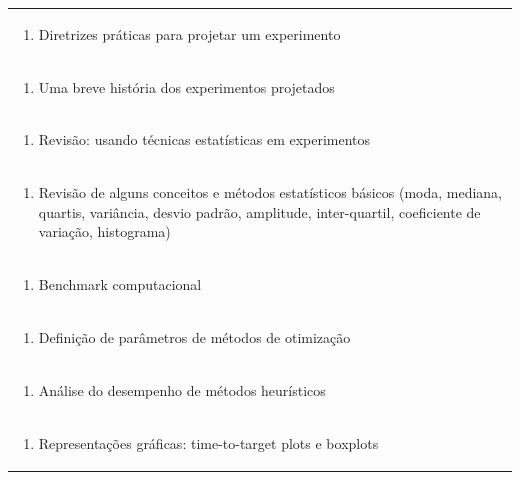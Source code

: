 \documentclass[11pt]{article}
\begin{document}
\begin{center}
\begin{longtable}{|p{4cm}|p{4cm}|p{4cm}|p{4cm}|}
\multicolumn{4}{|p{\dimexpr 16cm + 6\tabcolsep\relax}|}{\begin{enumerate}[start=2]\item Diretrizes práticas para projetar um experimento\end{enumerate}}\\
\multicolumn{4}{|p{\dimexpr 16cm + 6\tabcolsep\relax}|}{\begin{enumerate}[start=3]\item Uma breve história dos experimentos projetados\end{enumerate}}\\
\multicolumn{4}{|p{\dimexpr 16cm + 6\tabcolsep\relax}|}{\begin{enumerate}[start=4]\item Revisão: usando técnicas estatísticas em experimentos\end{enumerate}}\\
\multicolumn{4}{|p{\dimexpr 16cm + 6\tabcolsep\relax}|}{\begin{enumerate}[start=5]\item Revisão de alguns conceitos e métodos estatísticos básicos (moda, mediana, quartis, variância, desvio padrão, amplitude, inter-quartil, coeficiente de variação, histograma)\end{enumerate}}\\
\multicolumn{4}{|p{\dimexpr 16cm + 6\tabcolsep\relax}|}{\begin{enumerate}[start=6]\item Benchmark computacional\end{enumerate}}\\
\multicolumn{4}{|p{\dimexpr 16cm + 6\tabcolsep\relax}|}{\begin{enumerate}[start=7]\item Definição de parâmetros de métodos de otimização\end{enumerate}}\\
\multicolumn{4}{|p{\dimexpr 16cm + 6\tabcolsep\relax}|}{\begin{enumerate}[start=8]\item Análise do desempenho de métodos heurísticos\end{enumerate}}\\
\multicolumn{4}{|p{\dimexpr 16cm + 6\tabcolsep\relax}|}{\begin{enumerate}[start=9]\item Representações gráficas: time-to-target plots e boxplots\end{enumerate}}\\

\end{longtable}
\end{center}
\end{document}
